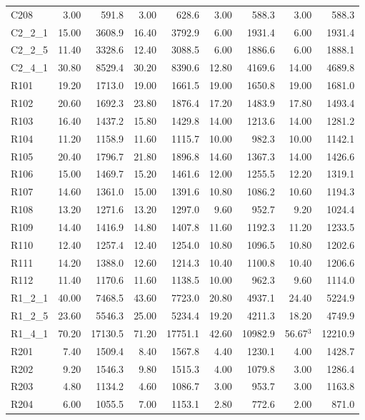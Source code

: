 \documentclass{article}
\begin{document}
{\begin{longtable}{l r r r r r r r r }
C208 & 3.00 & 591.8 & 3.00 & 628.6 & 3.00 & 588.3 & 3.00 & 588.3 \\
C2\_2\_1 & 15.00 & 3608.9 & 16.40 & 3792.9 & 6.00 & 1931.4 & 6.00 & 1931.4 \\
C2\_2\_5 & 11.40 & 3328.6 & 12.40 & 3088.5 & 6.00 & 1886.6 & 6.00 & 1888.1 \\
C2\_4\_1 & 30.80 & 8529.4 & 30.20 & 8390.6 & 12.80 & 4169.6 & 14.00 & 4689.8 \\
R101 & 19.20 & 1713.0 & 19.00 & 1661.5 & 19.00 & 1650.8 & 19.00 & 1681.0 \\
R102 & 20.60 & 1692.3 & 23.80 & 1876.4 & 17.20 & 1483.9 & 17.80 & 1493.4 \\
R103 & 16.40 & 1437.2 & 15.80 & 1429.8 & 14.00 & 1213.6 & 14.00 & 1281.2 \\
R104 & 11.20 & 1158.9 & 11.60 & 1115.7 & 10.00 & 982.3 & 10.00 & 1142.1 \\
R105 & 20.40 & 1796.7 & 21.80 & 1896.8 & 14.60 & 1367.3 & 14.00 & 1426.6 \\
R106 & 15.00 & 1469.7 & 15.20 & 1461.6 & 12.00 & 1255.5 & 12.20 & 1319.1 \\
R107 & 14.60 & 1361.0 & 15.00 & 1391.6 & 10.80 & 1086.2 & 10.60 & 1194.3 \\
R108 & 13.20 & 1271.6 & 13.20 & 1297.0 & 9.60 & 952.7 & 9.20 & 1024.4 \\
R109 & 14.40 & 1416.9 & 14.80 & 1407.8 & 11.60 & 1192.3 & 11.20 & 1233.5 \\
R110 & 12.40 & 1257.4 & 12.40 & 1254.0 & 10.80 & 1096.5 & 10.80 & 1202.6 \\
R111 & 14.20 & 1388.0 & 12.60 & 1214.3 & 10.40 & 1100.8 & 10.40 & 1206.6 \\
R112 & 11.40 & 1170.6 & 11.60 & 1138.5 & 10.00 & 962.3 & 9.60 & 1114.0 \\
R1\_2\_1 & 40.00 & 7468.5 & 43.60 & 7723.0 & 20.80 & 4937.1 & 24.40 & 5224.9 \\
R1\_2\_5 & 23.60 & 5546.3 & 25.00 & 5234.4 & 19.20 & 4211.3 & 18.20 & 4749.9 \\
R1\_4\_1 & 70.20 & 17130.5 & 71.20 & 17751.1 & 42.60 & 10982.9 & 56.67$^{3}$ & 12210.9 \\
R201 & 7.40 & 1509.4 & 8.40 & 1567.8 & 4.40 & 1230.1 & 4.00 & 1428.7 \\
R202 & 9.20 & 1546.3 & 9.80 & 1515.3 & 4.00 & 1079.8 & 3.00 & 1286.4 \\
R203 & 4.80 & 1134.2 & 4.60 & 1086.7 & 3.00 & 953.7 & 3.00 & 1163.8 \\
R204 & 6.00 & 1055.5 & 7.00 & 1153.1 & 2.80 & 772.6 & 2.00 & 871.0 \\

\end{longtable}}
\end{document}

